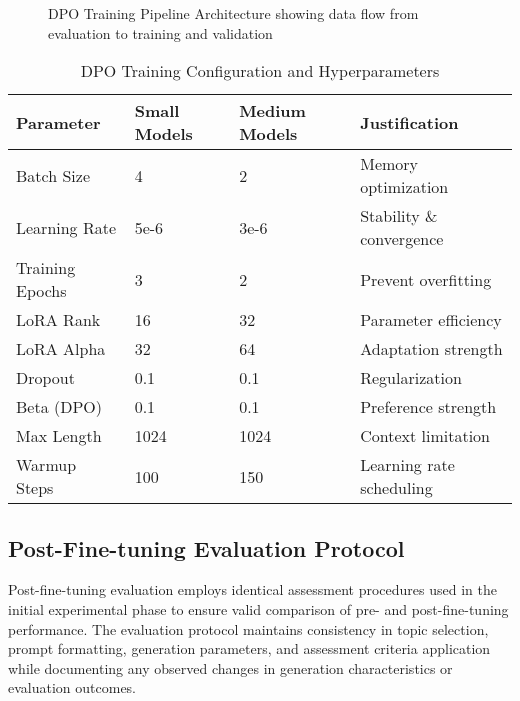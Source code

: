 \begin{figure}[htbp]
    \centering
    \caption{DPO Training Pipeline Architecture showing data flow from evaluation to training and validation}
    \label{fig:dpo-pipeline}
\end{figure}

\begin{table}[htbp]
    \centering
    \caption{DPO Training Configuration and Hyperparameters}
    \label{tab:dpo-configuration}
    \begin{tabular}{|l|l|l|l|}
    \hline
    \textbf{Parameter} & \textbf{Small Models} & \textbf{Medium Models} & \textbf{Justification} \\
    \hline
    Batch Size & 4 & 2 & Memory optimization \\
    Learning Rate & 5e-6 & 3e-6 & Stability \& convergence \\
    Training Epochs & 3 & 2 & Prevent overfitting \\
    LoRA Rank & 16 & 32 & Parameter efficiency \\
    LoRA Alpha & 32 & 64 & Adaptation strength \\
    Dropout & 0.1 & 0.1 & Regularization \\
    Beta (DPO) & 0.1 & 0.1 & Preference strength \\
    Max Length & 1024 & 1024 & Context limitation \\
    Warmup Steps & 100 & 150 & Learning rate scheduling \\
    \hline
    \end{tabular}
\end{table}

\subsection{Post-Fine-tuning Evaluation Protocol}

Post-fine-tuning evaluation employs identical assessment procedures used in the initial experimental phase to ensure valid comparison of pre- and post-fine-tuning performance. The evaluation protocol maintains consistency in topic selection, prompt formatting, generation parameters, and assessment criteria application while documenting any observed changes in generation characteristics or evaluation outcomes.

